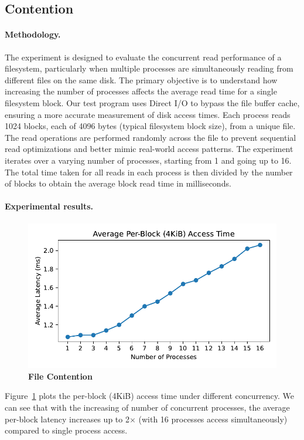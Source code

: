 \subsection{Contention}
\paragraph{Methodology.}
The experiment is designed to evaluate the concurrent read performance of a filesystem, particularly when multiple processes are simultaneously reading from different files on the same disk. The primary objective is to understand how increasing the number of processes affects the average read time for a single filesystem block. Our test program uses Direct I/O to bypass the file buffer cache, ensuring a more accurate measurement of disk access times. Each process reads 1024 blocks, each of 4096 bytes (typical filesystem block size), from a unique file. The read operations are performed randomly across the file to prevent sequential read optimizations and better mimic real-world access patterns. The experiment iterates over a varying number of processes, starting from 1 and going up to 16.
The total time taken for all reads in each process is then divided by the number of blocks to obtain the average block read time in milliseconds.

\paragraph{Experimental results.}
\begin{figure}[t]
	\centering
	\includegraphics[width=0.98\linewidth]{sourcecode/file/file_contention.pdf}
	\caption{\label{fig:file_contention} \textbf{File Contention}}
\end{figure}
Figure~\ref{fig:file_contention} plots the per-block (4KiB) access time under different concurrency. We can see that with the increasing of number of concurrent processes, the average per-block latency increases up to 2$\times$ (with 16 processes access simultaneously) compared to single process access.


